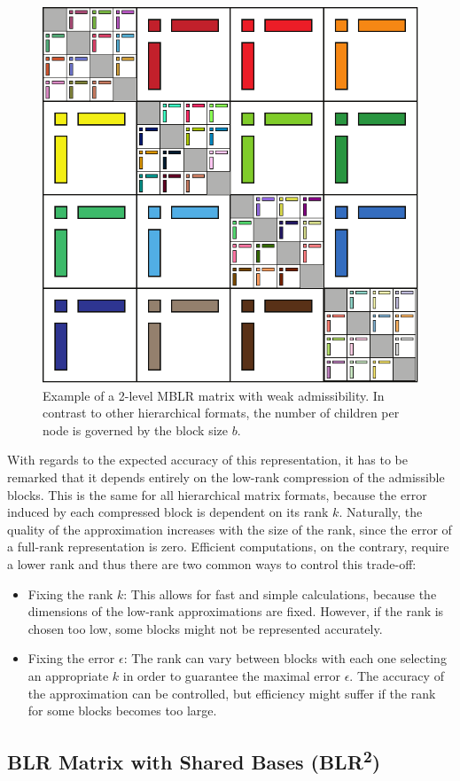 \begin{figure}[h]
    \centering
    \includegraphics[width=0.6\linewidth]{chapters/4_hierarchical_matrices/figures/MBLR.pdf}
    \caption[Multilevel Block Low-Rank Matrix]{Example of a 2-level MBLR matrix with weak admissibility. In contrast to other hierarchical formats, the number of children per node is governed by the block size $b$.}
    \label{fig:mblr}
\end{figure}

With regards to the expected accuracy of this representation, it has to be remarked that it depends entirely on the low-rank compression of the admissible blocks. This is the same for all hierarchical matrix formats, because the error induced by each compressed block is dependent on its rank $k$. Naturally, the quality of the approximation increases with the size of the rank, since the error of a full-rank representation is zero. Efficient computations, on the contrary, require a lower rank and thus there are two common ways to control this trade-off:
\begin{itemize}
    \item Fixing the rank $k$: This allows for fast and simple calculations, because the dimensions of the low-rank approximations are fixed. However, if the rank is chosen too low, some blocks might not be represented accurately.
    \item Fixing the error $\epsilon$: The rank can vary between blocks with each one selecting an appropriate $k$ in order to guarantee the maximal error $\epsilon$. The accuracy of the approximation can be controlled, but efficiency might suffer if the rank for some blocks becomes too large.
\end{itemize}

\subsection{BLR Matrix with Shared Bases (BLR\texorpdfstring{\textsuperscript{2}}{2})}
\label{sec:blr2}

